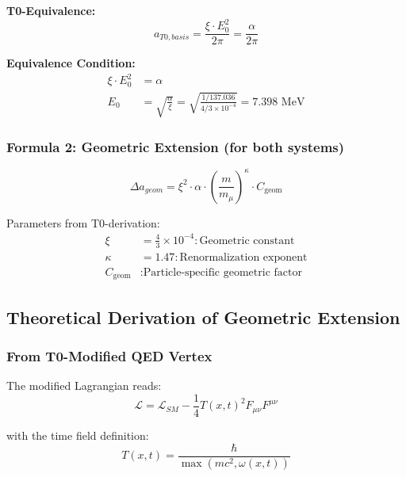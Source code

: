 \documentclass[12pt,a4paper]{article}
\numberwithin{equation}{section}
\newcommand{\xipar}{\xi}
\newcommand{\Cgeom}{C_{\text{geom}}}
\newcommand{\kappaT}{\kappa}
\newcommand{\mmu}{m_{\mu}}
\newcommand{\calL}{\mathcal{L}}
\begin{document}
	\textbf{T0-Equivalence:}
	\begin{equation}
		\label{eq:t0_basic}
		a_{T0,basis} = \frac{\xipar \cdot E_0^2}{2\pi} = \frac{\alpha}{2\pi}
	\end{equation}
	
	\textbf{Equivalence Condition:}
	\begin{align}
		\xipar \cdot E_0^2 &= \alpha\\
		E_0 &= \sqrt{\frac{\alpha}{\xipar}} = \sqrt{\frac{1/137.036}{4/3 \times 10^{-4}}} = 7.398 \text{ MeV}
	\end{align}
	
	\subsubsection{Formula 2: Geometric Extension (for both systems)}
	
	\begin{equation}
		\label{eq:geometric_extension}
		\Delta a_{geom} = \xipar^2 \cdot \alpha \cdot \left(\frac{m}{\mmu}\right)^\kappaT \cdot \Cgeom
	\end{equation}
	
	Parameters from T0-derivation:
	\begin{align}
		\xipar &= \frac{4}{3} \times 10^{-4} : \text{Geometric constant}\\
		\kappaT &= 1.47 : \text{Renormalization exponent}\\
		\Cgeom &: \text{Particle-specific geometric factor}
	\end{align}
	
	\subsection{Theoretical Derivation of Geometric Extension}
	
	\subsubsection{From T0-Modified QED Vertex}
	
	The modified Lagrangian reads:
	\begin{equation}
		\label{eq:modified_lagrangian}
		\calL = \calL_{SM} - \frac{1}{4}T(x,t)^2 F_{\mu\nu} F^{\mu\nu}
	\end{equation}
	
	with the time field definition:
	\begin{equation}
		\label{eq:time_field}
		T(x,t) = \frac{\hbar}{\max(mc^2, \omega(x,t))}
	\end{equation}
	
\end{document}
